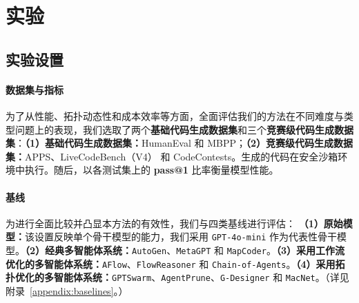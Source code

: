 \documentclass{article}
\theoremstyle{definition}
\begin{document}
\section{实验}
\label{exps}
\subsection{实验设置}

\paragraph{数据集与指标}
\label{gragph:dataset_and_metrics}为了从性能、拓扑动态性和成本效率等方面，全面评估我们的方法在不同难度与类型问题上的表现，我们选取了两个\textbf{基础代码生成数据集}和三个\textbf{竞赛级代码生成数据集}：\textbf{（1）基础代码生成数据集：}HumanEval\citep{chen2021evaluating} 和 MBPP\citep{austin2021program}；\textbf{（2）竞赛级代码生成数据集：}APPS\citep{hendrycks2021measuring}、LiveCodeBench（V4）\citep{jain2024livecodebench} 和 CodeContests\citep{li2022competition}。生成的代码在安全沙箱\citep{khan2023xcodeeval}环境中执行。随后，以各测试集上的 \textbf{pass@1} 比率衡量模型性能。

\paragraph{基线}
为进行全面比较并凸显本方法的有效性，我们与四类基线进行评估：
\textbf{（1）原始模型：}该设置反映单个骨干模型的能力，我们采用 \texttt{GPT-4o-mini} 作为代表性骨干模型。\textbf{（2）经典多智能体系统：}\texttt{AutoGen}\citep{wu2024autogen}、\texttt{MetaGPT}\citep{hong2024metagpt} 和 \texttt{MapCoder}\citep{islam2024mapcoder}。\textbf{（3）采用工作流优化的多智能体系统：}\texttt{AFlow}\citep{zhang2024aflow}、\texttt{FlowReasoner}\citep{gao2025flowreasoner} 和 \texttt{Chain-of-Agents}。\textbf{（4）采用拓扑优化的多智能体系统：}\texttt{GPTSwarm}\citep{zhuge2024gptswarm}、\texttt{AgentPrune}\citep{zhang2024cut}、\texttt{G-Designer}\citep{zhang2024g} 和 \texttt{MacNet}\citep{qian2024scaling}。（详见附录~\ref{appendix:baselines}。）
\end{document}
